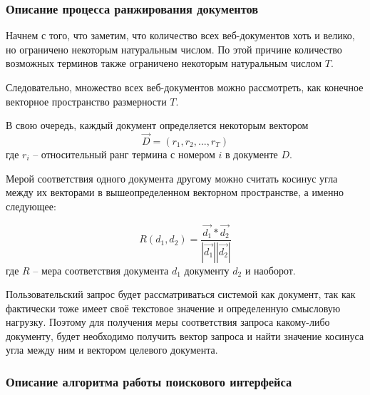 \subsubsection{Описание процесса ранжирования документов}

Начнем с того, что заметим, что количество всех веб-документов хоть и велико, но ограничено некоторым натуральным числом. По этой причине количество возможных терминов также ограничено некоторым натуральным числом $T$. 

Следовательно, множество всех веб-документов можно рассмотреть, как конечное векторное пространство размерности $T$. 

В свою очередь, каждый документ определяется некоторым вектором
\begin{equation}
\vec{D}=(r_1, r_2, ..., r_T)
\end{equation} где $r_i$ -- относительный ранг термина с номером $i$ в документе $D$.

Мерой соответствия одного документа другому можно считать косинус угла между их векторами в вышеопределенном векторном пространстве, а именно следующее:

\begin{equation}
R(d_1, d_2)=\frac{\vec{d_1} * \vec{d_2}}{|\vec{d_1}| |\vec{d_2}|}
\end{equation} где $R$ -- мера соответствия документа $d_1$ документу $d_2$ и наоборот.

Пользовательский запрос будет рассматриваться системой как документ, так как фактически тоже имеет своё текстовое значение и определенную смысловую нагрузку. Поэтому для получения меры соответствия запроса какому-либо документу, будет необходимо получить вектор запроса и найти значение косинуса угла между ним и вектором целевого документа.

\subsubsection{Описание алгоритма работы поискового интерфейса}

